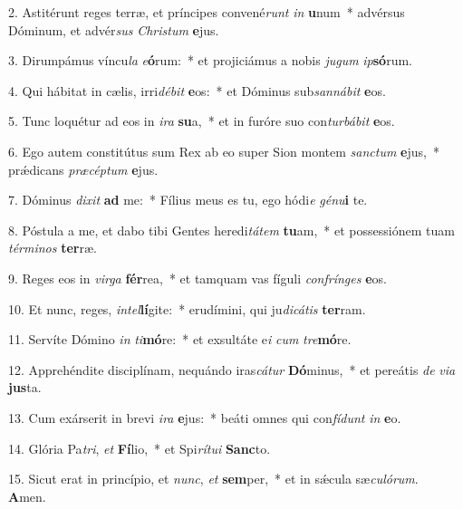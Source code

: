 2. Astitérunt reges terræ, et príncipes convené\textit{runt} \textit{in} \textbf{u}num~*  advérsus Dóminum, et advér\textit{sus} \textit{Chris}\textit{tum} \textbf{e}jus.\

3. Dirumpámus víncu\textit{la} \textit{e}\textbf{ó}rum:~*  et projiciámus a nobis \textit{ju}\textit{gum} \textit{ip}\textbf{só}rum.\

4. Qui hábitat in cælis, irri\textit{dé}\textit{bit} \textbf{e}os:~*  et Dóminus sub\textit{san}\textit{ná}\textit{bit} \textbf{e}os.\

5. Tunc loquétur ad eos in \textit{i}\textit{ra} \textbf{su}a,~*  et in furóre suo con\textit{tur}\textit{bá}\textit{bit} \textbf{e}os.\

6. Ego autem constitútus sum Rex ab eo super Sion montem \textit{sanc}\textit{tum} \textbf{e}jus,~*  prǽdicans \textit{præ}\textit{cép}\textit{tum} \textbf{e}jus.\

7. Dóminus \textit{di}\textit{xit} \textbf{ad} me:~*  Fílius meus es tu, ego hódi\textit{e} \textit{gé}\textit{nu}\textbf{i} te.\

8. Póstula a me, et dabo tibi Gentes heredi\textit{tá}\textit{tem} \textbf{tu}am,~*  et possessiónem tuam \textit{tér}\textit{mi}\textit{nos} \textbf{ter}ræ.\

9. Reges eos in \textit{vir}\textit{ga} \textbf{fér}rea,~*  et tamquam vas fíguli \textit{con}\textit{frín}\textit{ges} \textbf{e}os.\

10. Et nunc, reges, \textit{in}\textit{tel}\textbf{lí}gite:~*  erudímini, qui ju\textit{di}\textit{cá}\textit{tis} \textbf{ter}ram.\

11. Servíte Dómino \textit{in} \textit{ti}\textbf{mó}re:~*  et exsultáte e\textit{i} \textit{cum} \textit{tre}\textbf{mó}re.\

12. Apprehéndite disciplínam, nequándo iras\textit{cá}\textit{tur} \textbf{Dó}minus,~*  et pereátis \textit{de} \textit{vi}\textit{a} \textbf{jus}ta.\

13. Cum exárserit in brevi \textit{i}\textit{ra} \textbf{e}jus:~*  beáti omnes qui con\textit{fí}\textit{dunt} \textit{in} \textbf{e}o.\

14. Glória Pa\textit{tri}, \textit{et} \textbf{Fí}lio,~*  et Spi\textit{rí}\textit{tu}\textit{i} \textbf{Sanc}to.\

15. Sicut erat in princípio, et \textit{nunc}, \textit{et} \textbf{sem}per,~*  et in sǽcula sæ\textit{cu}\textit{ló}\textit{rum}. \textbf{A}men.\

